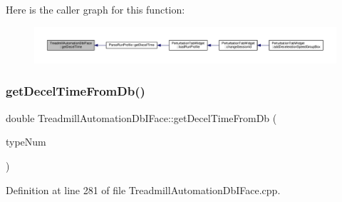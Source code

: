 Here is the caller graph for this function\+:
\nopagebreak
\begin{figure}[H]
\begin{center}
\leavevmode
\includegraphics[width=350pt]{class_treadmill_automation_db_i_face_a7b8087febc0ab723b454d07c33f5aab0_icgraph}
\end{center}
\end{figure}
\mbox{\label{class_treadmill_automation_db_i_face_ab0f40648321f15da9cad739db19dd6fa}} 
\subsubsection{\texorpdfstring{get\+Decel\+Time\+From\+Db()}{getDecelTimeFromDb()}}
{\footnotesize\ttfamily double Treadmill\+Automation\+Db\+I\+Face\+::get\+Decel\+Time\+From\+Db (\begin{DoxyParamCaption}\item[{Q\+String}]{type\+Num }\end{DoxyParamCaption})}



Definition at line 281 of file Treadmill\+Automation\+Db\+I\+Face.\+cpp.

